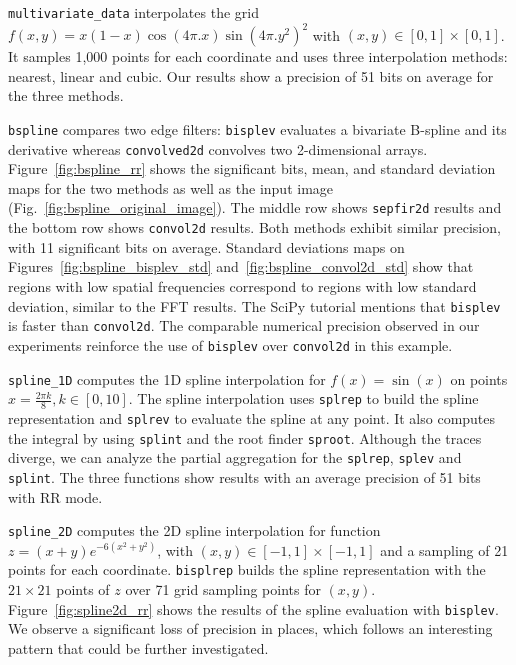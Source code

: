 \documentclass[10pt,journal,compsoc]{IEEEtran}
\begin{document}
\texttt{multivariate\_data} interpolates the grid $f(x,y)=x(1-x)\cos(4\pi.x)
    \sin(4\pi.y^2)^2$ with $(x,y) \in [0,1] \times [0,1]$. It samples 1,000 points
for each coordinate and uses three interpolation methods: nearest, linear and
cubic. Our results show a precision of 51 bits on average for the three methods.


\texttt{bspline} compares two edge filters: \texttt{bisplev} evaluates a
bivariate B-spline and its derivative whereas \texttt{convolved2d} convolves two
2-dimensional arrays. Figure~\ref{fig:bspline_rr} shows the significant bits,
mean, and standard deviation maps for the two methods as well as the input image
(Fig.~\ref{fig:bspline_original_image}). The middle row shows \texttt{sepfir2d}
results and the bottom row shows \texttt{convol2d} results. Both methods exhibit
similar precision, with 11 significant bits on average. Standard deviations maps
on Figures~\ref{fig:bspline_bisplev_std} and~\ref{fig:bspline_convol2d_std} show
that regions with low spatial frequencies correspond to regions with low
standard deviation, similar to the FFT results. The SciPy tutorial mentions that
\texttt{bisplev} is faster than \texttt{convol2d}. The comparable numerical
precision observed in our experiments reinforce the use of \texttt{bisplev} over
\texttt{convol2d} in this example.

\texttt{spline\_1D} computes the 1D spline interpolation for $f(x)=\sin(x)$ on
points $x=\frac{2\pi k}{8}, k \in [0, 10]$. The spline interpolation uses
\texttt{splrep} to build the spline representation and \texttt{splrev} to
evaluate the spline at any point. It also computes the integral by using
\texttt{splint} and the root finder \texttt{sproot}. Although the traces
diverge, we can analyze the partial aggregation for the \texttt{splrep},
\texttt{splev} and \texttt{splint}. The three functions show results with an
average precision of 51 bits with RR mode.

\texttt{spline\_2D} computes the 2D spline interpolation for function
$z=(x+y)e^{-6(x^2+y^2)}$, with $(x,y) \in [-1,1]\times[-1,1]$ and a sampling of
21 points for each coordinate. \texttt{bisplrep} builds the spline
representation with the $21 \times 21$ points of $z$ over 71 grid sampling
points for $(x,y)$. Figure~\ref{fig:spline2d_rr} shows the results of the spline
evaluation with \texttt{bisplev}.  We observe a significant loss of precision in
places, which follows an interesting pattern that could be further investigated.
\end{document}

